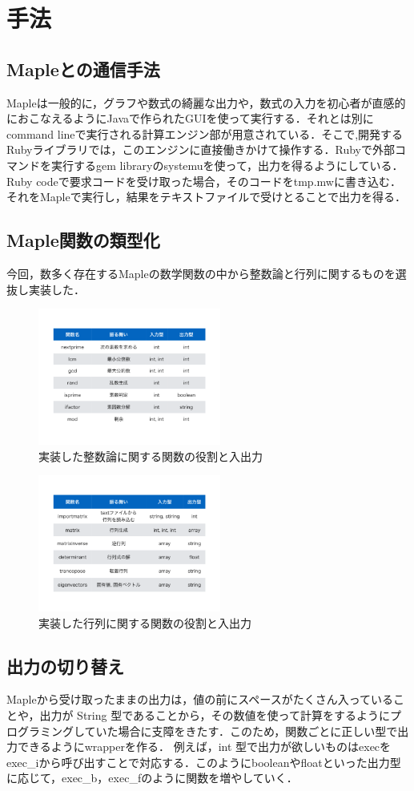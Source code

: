 \section{手法}
\subsection{Mapleとの通信手法}
Mapleは一般的に，グラフや数式の綺麗な出力や，数式の入力を初心者が直感的におこなえるようにJavaで作られたGUIを使って実行する．それとは別にcommand lineで実行される計算エンジン部が用意されている．そこで,開発するRubyライブラリでは，このエンジンに直接働きかけて操作する．Rubyで外部コマンドを実行するgem libraryのsystemuを使って，出力を得るようにしている．Ruby codeで要求コードを受け取った場合，そのコードをtmp.mwに書き込む．それをMapleで実行し，結果をテキストファイルで受けとることで出力を得る．

\subsection{Maple関数の類型化}
今回，数多く存在するMapleの数学関数の中から整数論と行列に関するものを選抜し実装した．

\begin{figure}[htbp]\begin{center}
\includegraphics[width=6cm,bb=0 0 442 500]{../figs/./mapleruby_eringi.001.png}
\caption{実装した整数論に関する関数の役割と入出力}
\label{default}\end{center}\end{figure}
\begin{figure}[htbp]\begin{center}
\includegraphics[width=6cm,bb=0 0 442 500]{../figs/./mapleruby_eringi.002.png}
\caption{実装した行列に関する関数の役割と入出力}
\label{default}\end{center}\end{figure}
\newpage

\subsection{出力の切り替え}
Mapleから受け取ったままの出力は，値の前にスペースがたくさん入っていることや，出力が String 型であることから，その数値を使って計算をするようにプログラミングしていた場合に支障をきたす．このため，関数ごとに正しい型で出力できるようにwrapperを作る．
例えば，int 型で出力が欲しいものはexecをexec\_iから呼び出すことで対応する．このようにbooleanやfloatといった出力型に応じて，exec\_b，exec\_fのように関数を増やしていく．

